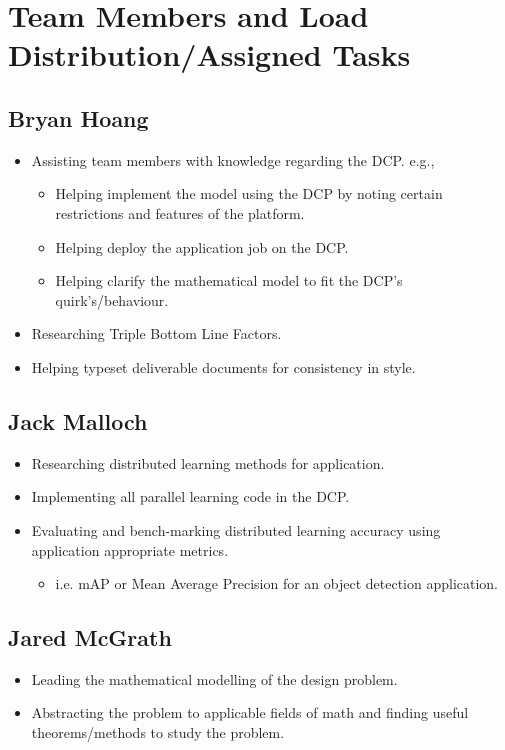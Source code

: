 \documentclass[../mthe-493-project-proposal.tex]{subfiles}
\begin{document}
    \chapter{Team Members and Load Distribution/Assigned Tasks}
    \label{ch:team-load-distribution}

    \section{Bryan Hoang}
    \begin{itemize}
        \item Assisting team members with knowledge regarding the DCP. e.g., \begin{itemize}
                  \item Helping implement the model using the DCP by noting certain restrictions and features of the platform.
                  \item Helping deploy the application job on the DCP.
                  \item Helping clarify the mathematical model to fit the DCP's quirk's/behaviour.
              \end{itemize}
        \item Researching Triple Bottom Line Factors.
        \item Helping typeset deliverable documents for consistency in style.
    \end{itemize}

    \section{Jack Malloch}
    \begin{itemize}
        \item Researching distributed learning methods for application.
        \item Implementing all parallel learning code in the DCP.
        \item Evaluating and bench-marking distributed learning accuracy using application appropriate metrics. 
            \begin{itemize}
                \item i.e. mAP or Mean Average Precision for an object detection application.
            \end{itemize}
    \end{itemize}

    \section{Jared McGrath}
    \begin{itemize}
        \item Leading the mathematical modelling of the design problem.
        \item Abstracting the problem to applicable fields of math and finding useful theorems/methods to study the problem.
    \end{itemize}
\end{document}
